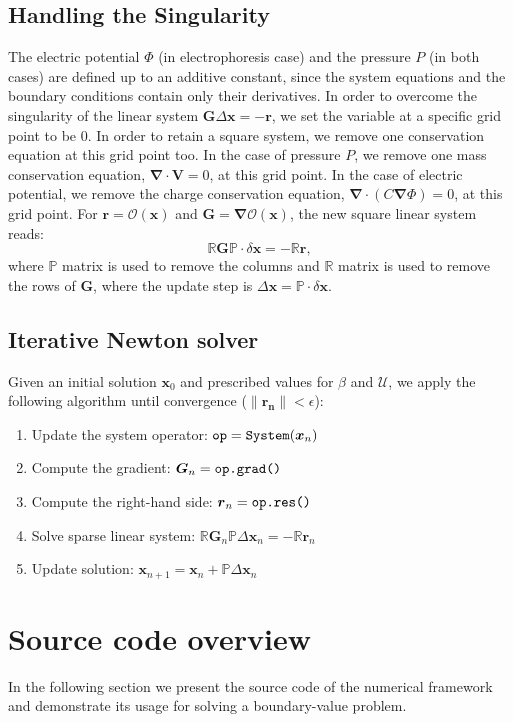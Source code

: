 \documentclass[MSc,beforeExam]{iitcsthesis}
\newcommand\eps \epsilon
\newcommand{\pars}[1]{\left(#1\right)}
\newcommand\bnabla{\boldsymbol{\nabla}}
\newcommand\bV{\boldsymbol{V}}
\newcommand\bG{\boldsymbol{G}}
\newcommand\bx{\boldsymbol{x}}
\newcommand\br{\boldsymbol{r}}
\newcommand\cO{\mathcal{O}}
\newcommand\cU{\mathscr{U}}
\begin{document}
\subsection{Handling the Singularity} \label{sec:singular}
The electric potential $\varPhi$ (in electrophoresis case) and the pressure $P$ (in both cases) 
are defined up to an additive constant, since the system equations and the boundary conditions
contain only their derivatives.
In order to overcome the singularity of the linear system 
$\bG \Delta\bx = -\br$, we set the variable at 
a specific grid point to be $0$.
In order to retain a square system, we remove one conservation equation at this grid point too.
In the case of pressure $P$, we remove one mass conservation equation,
$\bnabla \cdot \bV = 0$, at this grid point. 
In the case of electric potential, we remove the charge conservation
equation, $\bnabla \cdot \pars{C \bnabla \varPhi} = 0$, at this grid point.
For $\br = \cO(\bx)$ and $\bG = \bnabla \cO(\bx)$, the new square linear system reads:
\begin{equation}
\mathbb{R} \bG \mathbb{P} \cdot \delta\bx = -\mathbb{R} \br,
\end{equation}
where $\mathbb{P}$ matrix is used to remove the columns
and $\mathbb{R}$ matrix is used to remove the rows of $\bG$,
where the update step is $\Delta \bx = \mathbb{P} \cdot \delta \bx$.

\subsection{Iterative Newton solver}
Given an initial solution $\bx_0$ and prescribed values for $\beta$ and $\cU$, 
we apply the following algorithm until convergence ($\|\boldsymbol{r_n}\| < \eps$):
\begin{enumerate}
\item Update the system operator: $\verb|op| = \verb|System|(\bx_{n})$
\item Compute the gradient: $\boldsymbol{G}_n = \verb|op.grad()|$
\item Compute the right-hand side: $\boldsymbol{r}_n = \verb|op.res()|$
\item Solve sparse linear system: $\mathbb{R}\boldsymbol{G}_n \mathbb{P} \Delta \bx_n = -\mathbb{R}\boldsymbol{r}_n$
\item Update solution: $\bx_{n+1} = \bx_{n} + \mathbb{P}\Delta \bx_{n}$
\end{enumerate}

\section{Source code overview}
In the following section we present the source code of the numerical framework and demonstrate its
usage for solving a boundary-value problem.
\end{document}
